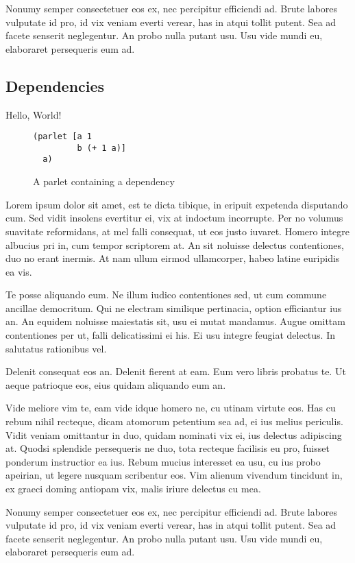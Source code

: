 \documentclass[10pt, letterpapper]{proc}
\begin{document}
Nonumy semper consectetuer eos ex, nec percipitur efficiendi ad. Brute labores vulputate id pro, id vix veniam everti verear, has in atqui tollit putent. Sea ad facete senserit neglegentur. An probo nulla putant usu. Usu vide mundi eu, elaboraret persequeris eum ad.

\subsection{Dependencies}
Hello, World!

\begin{figure}[h]
\centering
{}
\begin{verbatim}
(parlet [a 1
         b (+ 1 a)]
  a)
\end{verbatim}
\caption{A parlet containing a dependency}
\label{fig:parlet_dep}
\end{figure}

Lorem ipsum dolor sit amet, est te dicta tibique, in eripuit expetenda disputando cum. Sed vidit insolens evertitur ei, vix at indoctum incorrupte. Per no volumus suavitate reformidans, at mel falli consequat, ut eos justo iuvaret. Homero integre albucius pri in, cum tempor scriptorem at. An sit noluisse delectus contentiones, duo no erant inermis. At nam ullum eirmod ullamcorper, habeo latine euripidis ea vis.

Te posse aliquando eum. Ne illum iudico contentiones sed, ut cum commune ancillae democritum. Qui ne electram similique pertinacia, option efficiantur ius an. An equidem noluisse maiestatis sit, usu ei mutat mandamus. Augue omittam contentiones per ut, falli delicatissimi ei his. Ei usu integre feugiat delectus. In salutatus rationibus vel.

Delenit consequat eos an. Delenit fierent at eam. Eum vero libris probatus te. Ut aeque patrioque eos, eius quidam aliquando eum an.

Vide meliore vim te, eam vide idque homero ne, cu utinam virtute eos. Has cu rebum nihil recteque, dicam atomorum petentium sea ad, ei ius melius periculis. Vidit veniam omittantur in duo, quidam nominati vix ei, ius delectus adipiscing at. Quodsi splendide persequeris ne duo, tota recteque facilisis eu pro, fuisset ponderum instructior ea ius. Rebum mucius interesset ea usu, cu ius probo apeirian, ut legere nusquam scribentur eos. Vim alienum vivendum tincidunt in, ex graeci doming antiopam vix, malis iriure delectus cu mea.

Nonumy semper consectetuer eos ex, nec percipitur efficiendi ad. Brute labores vulputate id pro, id vix veniam everti verear, has in atqui tollit putent. Sea ad facete senserit neglegentur. An probo nulla putant usu. Usu vide mundi eu, elaboraret persequeris eum ad.
\end{document}
